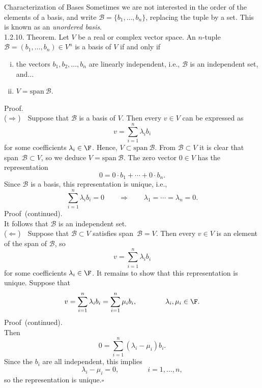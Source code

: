 \documentclass[smaller,hyperref={CJKbookmarks=true}]{beamer}
\newcommand{\myseries}[2]{$#1_1,#1_2,\dots,#1_#2$}
\begin{document}
\begin{frame}{Characterization of Bases}
Sometimes we are not interested in the order of the elements of a basis, and write $\mathcal{B}=\{b_1,\ldots,b_n\}$, replacing the tuple by a set. This is known as an \emph{unordered basis}.\\
\alert{1.2.10. Theorem.} Let $V$ be a real or complex vector space. An $n$-tuple $\mathcal{B}=(b_1,\ldots,b_n)\in V^n$ is a basis of $V$ if and only if
\begin{enumerate}[(i)]
  \item the vectors \myseries{b}{n} are linearly independent, i.e., $\mathcal{B}$ is an independent set, and...
  \item $V=\text{span}~\mathcal{B}.$
\end{enumerate}
\newpage
\begin{spacing}{1}
{\Large{\alert{Proof.}}}\\[7pt]
\alert{($\Rightarrow$)}~~Suppose that $\mathcal{B}$ is a basis of $V$. Then every $v\in V$ can be expressed as
\begin{equation*}
  v=\sum_{i=1}^{n}\lambda_ib_i
\end{equation*}
for some coef{}ficients $\lambda_i\in\F$. Hence, $V\subset\text{span}~\mathcal{B}.$ From $\mathcal{B}\subset V$ it is clear that span~$\mathcal{B}\subset V$, so we deduce $V=\text{span}~\mathcal{B}$. The zero vector $0\in V$ has the representation
\[0=0\cdot b_1+\cdots+0\cdot b_n.\]
Since $\mathcal{B}$ is a basis, this representation is unique, i.e.,
\[\sum_{i=1}^{n}\lambda_ib_i=0\qquad\Rightarrow\qquad\lambda_1=\cdots=\lambda_n=0.\]
\newpage
{\Large{\alert{Proof~(continued).}}}\\[7pt]
It follows that $\mathcal{B}$ is an independent set.\\[11pt]
\alert{($\Leftarrow$)}~~Suppose that $\mathcal{B}\subset V$ satisfies span~$\mathcal{B}=V$. Then every $v\in V$ is an element of the span of $\mathcal{B}$, so
\[v=\sum_{i=1}^{n}\lambda_ib_i\]
for some coef{}ficients $\lambda_i\in\F$. It remains to show that this representation is unique. Suppose that
\[v=\sum_{i=1}^{n}\lambda_ib_i=\sum_{i=1}^{n}\mu_ib_i,\qquad\qquad\lambda_i,\mu_i\in\F.\]
\newpage
{\Large{\alert{Proof~(continued).}}}\\[7pt]
Then
\[0=\sum_{i=1}^{n}(\lambda_i-\mu_i)b_i.\]
Since the $b_i$ are all independent, this implies
\[\lambda_i-\mu_i=0,\qquad\qquad i=1,\ldots,n,\]
so the representation is unique.\qquad\qquad\qquad\qquad\qquad\qquad\qquad\qquad\qquad\qquad $\square$
\end{spacing}
\end{frame}
\end{document}
